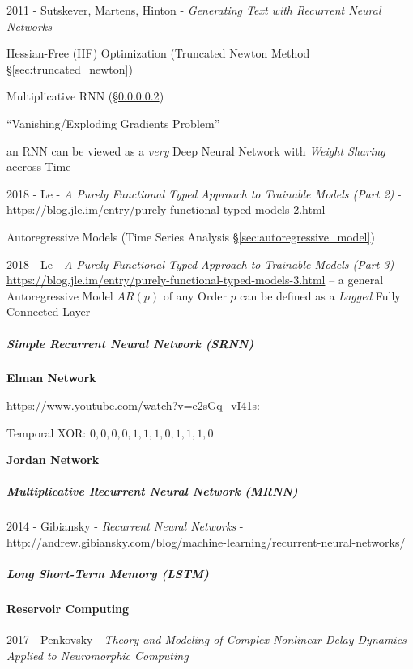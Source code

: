 \asterism

2011 - Sutskever, Martens, Hinton -
  \emph{Generating Text with Recurrent Neural Networks}

Hessian-Free (HF) Optimization (Truncated Newton Method
\S\ref{sec:truncated_newton})

Multiplicative RNN (\S\ref{sec:mrnn})

``Vanishing/Exploding Gradients Problem''

an RNN can be viewed as a \emph{very} Deep Neural Network with \emph{Weight
  Sharing} accross Time

\asterism

2018 - Le -
\emph{A Purely Functional Typed Approach to Trainable Models (Part 2)} -
\url{https://blog.jle.im/entry/purely-functional-typed-models-2.html}

\fist Autoregressive Models (Time Series Analysis
\S\ref{sec:autoregressive_model})

2018 - Le -
\emph{A Purely Functional Typed Approach to Trainable Models (Part 3)} -
\url{https://blog.jle.im/entry/purely-functional-typed-models-3.html}
-- a general Autoregressive Model $AR(p)$ of any Order $p$ can be defined as a
\emph{Lagged} Fully Connected Layer



\subparagraph{Simple Recurrent Neural Network (SRNN)}\label{sec:srnn}\hfill

\textbf{Elman Network}

\url{https://www.youtube.com/watch?v=e2sGq_vI41s}:

Temporal XOR:
$0, 0, 0, 0, 1, 1, 1, 0, 1, 1, 1, 0$


\textbf{Jordan Network}



\subparagraph{Multiplicative Recurrent Neural Network (MRNN)}\label{sec:mrnn}
\hfill

2014 - Gibiansky - \emph{Recurrent Neural Networks} -
\url{http://andrew.gibiansky.com/blog/machine-learning/recurrent-neural-networks/}



\subparagraph{Long Short-Term Memory (LSTM)}\label{sec:lstm}\hfill



\paragraph{Reservoir Computing}\label{sec:reservoir_computing}\hfill

2017 - Penkovsky - \emph{Theory and Modeling of Complex Nonlinear Delay Dynamics
  Applied to Neuromorphic Computing}

